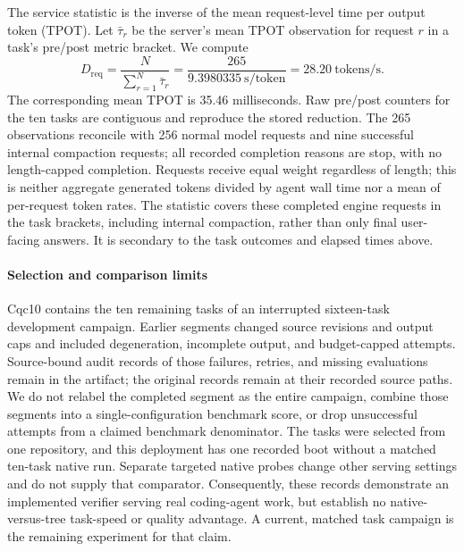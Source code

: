 The service statistic is the inverse of the mean request-level time per output token (TPOT). Let $\bar\tau_r$ be the server's mean TPOT observation for request $r$ in a task's pre/post metric bracket. We compute
\begin{equation}
 D_{\mathrm{req}} = \frac{N}{\sum_{r=1}^{N}\bar\tau_r}
 = \frac{265}{9.3980335\ \mathrm{s/token}}
 = 28.20\ \mathrm{tokens/s}.
\end{equation}
The corresponding mean TPOT is 35.46 milliseconds. Raw pre/post counters for the ten tasks are contiguous and reproduce the stored reduction. The 265 observations reconcile with 256 normal model requests and nine successful internal compaction requests; all recorded completion reasons are stop, with no length-capped completion. Requests receive equal weight regardless of length; this is neither aggregate generated tokens divided by agent wall time nor a mean of per-request token rates. The statistic covers these completed engine requests in the task brackets, including internal compaction, rather than only final user-facing answers. It is secondary to the task outcomes and elapsed times above.

\paragraph{Selection and comparison limits}
Cqc10 contains the ten remaining tasks of an interrupted sixteen-task development campaign. Earlier segments changed source revisions and output caps and included degeneration, incomplete output, and budget-capped attempts. Source-bound audit records of those failures, retries, and missing evaluations remain in the artifact; the original records remain at their recorded source paths. We do not relabel the completed segment as the entire campaign, combine those segments into a single-configuration benchmark score, or drop unsuccessful attempts from a claimed benchmark denominator. The tasks were selected from one repository, and this deployment has one recorded boot without a matched ten-task native run. Separate targeted native probes change other serving settings and do not supply that comparator. Consequently, these records demonstrate an implemented verifier serving real coding-agent work, but establish no native-versus-tree task-speed or quality advantage. A current, matched task campaign is the remaining experiment for that claim.
